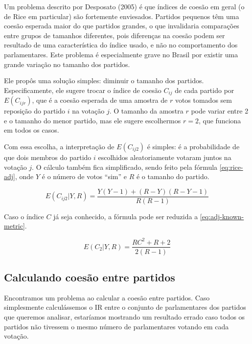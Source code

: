 \documentclass[a4paper,titlepage]{ppgi}\usepackage[]{graphicx}\usepackage[]{color}
\begin{document}
Um problema descrito por Desposato (2005) é que índices de coesão em geral
(o de Rice em particular) são fortemente enviesados. Partidos pequenos têm uma
coesão esperada maior do que partidos grandes, o que invalidaria comparações
entre grupos de tamanhos diferentes, pois diferenças na coesão podem ser
resultado de uma característica do índice usado, e não no comportamento dos
parlamentares. Este problema é especialmente grave no Brasil por existir uma
grande variação no tamanho dos partidos.\nocite{Desposato2005}

Ele propôs uma solução simples: diminuir o tamanho dos partidos.
Especificamente, ele sugere trocar o índice de coesão $C_{ij}$ de cada
partido por $E(C_{ijr})$, que é a coesão esperada de uma amostra de $r$ votos
tomados sem reposição do partido $i$ na votação $j$. O tamanho da amostra $r$
pode variar entre 2 e o tamanho do menor partido, mas ele sugere escolhermos $r
= 2$, que funciona em todos os casos.\nocite{Desposato2005}

Com essa escolha, a interpretação de $E(C_{ij2})$ é simples: é a probabilidade
de que dois membros do partido $i$ escolhidos aleatoriamente votaram juntos na
votação $j$. O cálculo também fica simplificado, sendo feito pela fórmula
\ref{eq:rice-adj}, onde $Y$ é o número de votos ``sim'' e $R$ é o tamanho do
partido.\nocite{Desposato2005}

\begin{equation}\label{eq:rice-adj}
  E(C_{ij2}|Y, R) = \frac{Y(Y - 1) + (R - Y)(R - Y - 1)}{R(R - 1)}
\end{equation}

Caso o índice $C$ já seja conhecido, a fórmula pode ser reduzida a
\ref{eq:adj-known-metric}.\nocite{Desposato2005}

\begin{equation}\label{eq:adj-known-metric}
  E(C_2|Y, R) = \frac{RC^2 + R + 2}{2(R - 1)}
\end{equation}

\subsection{Calculando coesão entre partidos}

Encontramos um problema ao calcular a coesão entre partidos. Caso simplesmente
calculássemos o \gls{IR} entre o conjunto de parlamentares dos partidos
que queremos analisar, estaríamos mostrando um resultado errado caso todos os
partidos não tivessem o mesmo número de parlamentares votando em cada votação.
\end{document}
